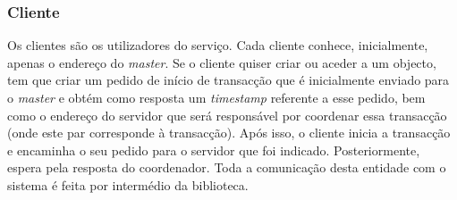 \subsubsection{Cliente}

Os clientes são os utilizadores do serviço. Cada cliente conhece, inicialmente, apenas o endereço do \textit{master}. Se o cliente quiser criar ou aceder a um objecto, tem que criar um pedido de início de transacção que é inicialmente enviado para o \textit{master} e obtém como resposta um \textit{timestamp} referente a esse pedido, bem como o endereço do servidor que será responsável por coordenar essa transacção (onde este par corresponde à transacção). Após isso, o cliente inicia a transacção e encaminha o seu pedido para o servidor que foi indicado. Posteriormente, espera pela resposta do coordenador. Toda a comunicação desta entidade com o sistema é feita por intermédio da biblioteca.
